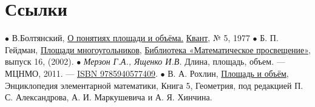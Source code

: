 \documentclass[a4paper,8pt,leqno]{article}
\theoremstyle{plain}
\theoremstyle{definition} %
\theoremstyle{remark} %
\begin{document}
\section{Ссылки}
$\bullet$ В.Болтянский, \href{http://kvant.mccme.ru/1977/05/o_ponyatiyah_ploshchadi_i_obem.htm}{О понятиях площади и объёма.} \href{https://ru.wikipedia.org/wiki/\%D0\%9A\%D0\%B2\%D0\%B0\%D0\%BD\%D1\%82\_(\%D0\%B6\%D1\%83\%D1\%80\%D0\%BD\%D0\%B0\%D0\%BB)}{Квант}, № 5, 1977
$\bullet$ Б. П. Гейдман, \href{http://www.mccme.ru/mmmf-lectures/books/books/book.9.pdf}{Площади многоугольников}, \href{http://www.mccme.ru/mmmf-lectures/books/books/books.php}{Библиотека «Математическое просвещение»}, выпуск 16, (2002).
$\bullet$ \textit{Мерзон Г.А., Ященко И.В.} Длина, площадь, объем. — МЦНМО, 2011. — \href{https://ru.wikipedia.org/wiki/\%D0\%A1\%D0\%BB\%D1\%83\%D0\%B6\%D0\%B5\%D0\%B1\%D0\%BD\%D0\%B0\%D1\%8F:\%D0\%98\%D1\%81\%D1\%82\%D0\%BE\%D1\%87\%D0\%BD\%D0\%B8\%D0\%BA\%D0\%B8\_\%D0\%BA\%D0\%BD\%D0\%B8\%D0\%B3/9785940577409}{ISBN 9785940577409}.
$\bullet$ В. А. Рохлин, \href{http://www.mccme.ru/free-books/djvu/encikl/enc-el-5.htm}{Площадь и объём}, Энциклопедия элементарной математики, Книга 5, Геометрия, под редакцией П. С. Александрова, А. И. Маркушевича и А. Я. Хинчина.
\end{document}
